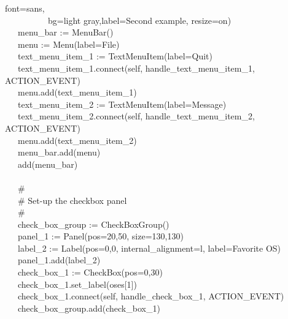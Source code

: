 {{\textquotedbl}font=sans{\textquotedbl}, \\
\>   \ \ \ \ \ \ \ \ \ \ {\textquotedbl}bg=light
gray{\textquotedbl},{\textquotedbl}label=Second example{\textquotedbl},
{\textquotedbl}resize=on{\textquotedbl}) \\
\>   \ \ \ menu\_bar := MenuBar() \\
\>   \ \ \ menu := Menu({\textquotedbl}label=File{\textquotedbl}) \\
\>   \ \ \ text\_menu\_item\_1 :=
TextMenuItem({\textquotedbl}label=Quit{\textquotedbl}) \\
\>   \ \ \ text\_menu\_item\_1.connect(self,
{\textquotedbl}handle\_text\_menu\_item\_1{\textquotedbl},
ACTION\_EVENT) \\
\>   \ \ \ menu.add(text\_menu\_item\_1) \\
\>   \ \ \ text\_menu\_item\_2 :=
TextMenuItem({\textquotedbl}label=Message{\textquotedbl}) \\
\>   \ \ \ text\_menu\_item\_2.connect(self,
{\textquotedbl}handle\_text\_menu\_item\_2{\textquotedbl},
ACTION\_EVENT) \\
\>   \ \ \ menu.add(text\_menu\_item\_2) \\
\>   \ \ \ menu\_bar.add(menu) \\
\>   \ \ \ add(menu\_bar) \\
\ \\
\>   \ \ \ \# \\
\>   \ \ \ \# Set-up the checkbox panel \\
\>   \ \ \ \# \\
\>   \ \ \ check\_box\_group := CheckBoxGroup() \\
\>   \ \ \ panel\_1 := Panel({\textquotedbl}pos=20,50{\textquotedbl},
{\textquotedbl}size=130,130{\textquotedbl}) \\
\>   \ \ \ label\_2 := Label({\textquotedbl}pos=0,0{\textquotedbl},
{\textquotedbl}internal\_alignment=l{\textquotedbl},
{\textquotedbl}label=Favorite OS{\textquotedbl}) \\
\>   \ \ \ panel\_1.add(label\_2) \\
\>   \ \ \ check\_box\_1 :=
CheckBox({\textquotedbl}pos=0,30{\textquotedbl}) \\
\>   \ \ \ check\_box\_1.set\_label(oses[1]) \\
\>   \ \ \ check\_box\_1.connect(self,
{\textquotedbl}handle\_check\_box\_1{\textquotedbl}, ACTION\_EVENT) \\
\>   \ \ \ check\_box\_group.add(check\_box\_1) \\
}
